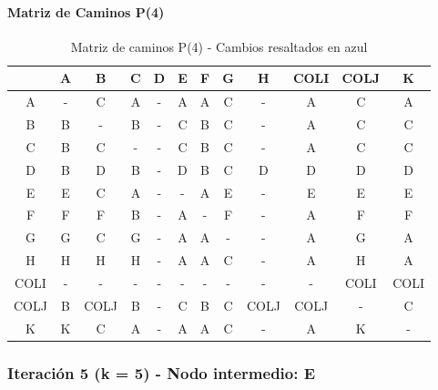 \documentclass[12pt]{article}
\begin{document}
\paragraph{Matriz de Caminos P(4)}
\begin{table}[h!]
\centering
\begin{tabular}{|c|c|c|c|c|c|c|c|c|c|c|c|}
\hline
 & A & B & C & D & E & F & G & H & COLI & COLJ & K \\\hline
A & - & C & A & - & A & A & C & - & A & C & A \\\hline
B & B & - & B & - & C & B & C & - & A & C & C \\\hline
C & B & C & - & - & C & B & C & - & A & C & C \\\hline
D & B & D & B & - & D & B & C & D & D & D & D \\\hline
E & E & C & A & - & - & A & E & - & E & E & E \\\hline
F & F & F & B & - & A & - & F & - & A & F & F \\\hline
G & G & C & G & - & A & A & - & - & A & G & A \\\hline
H & H & H & H & - & A & A & C & - & A & H & A \\\hline
COLI & - & - & - & - & - & - & - & - & - & COLI & COLI \\\hline
COLJ & B & COLJ & B & - & C & B & C & COLJ & COLJ & - & C \\\hline
K & K & C & A & - & A & A & C & - & A & K & - \\\hline
\end{tabular}
\caption{Matriz de caminos P(4) - Cambios resaltados en azul}
\end{table}

\subsubsection{Iteración 5 (k = 5) - Nodo intermedio: E}
\end{document}

